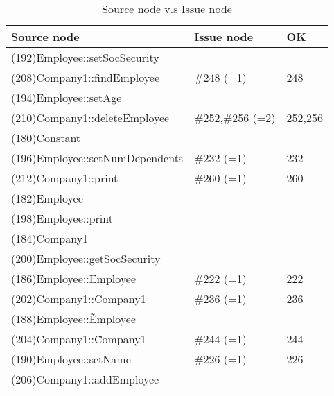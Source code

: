 \begin{table}[hb]
\begin{center}
\begin{tabular}{|l|l|l|}
\hline
Source node & Issue node  & OK\\
\hline
(192)Employee::setSocSecurity &  & \\
(208)Company1::findEmployee & \#248 (=1) & 248\\
(194)Employee::setAge &  & \\
(210)Company1::deleteEmployee & \#252,\#256 (=2) & 252,256 \\
(180)Constant &  & \\
(196)Employee::setNumDependents & \#232 (=1) & 232\\
(212)Company1::print & \#260 (=1) & 260\\
(182)Employee &  & \\
(198)Employee::print &  & \\
(184)Company1 &  & \\
(200)Employee::getSocSecurity &  & \\
(186)Employee::Employee & \#222 (=1) & 222\\
(202)Company1::Company1 & \#236 (=1) & 236\\
(188)Employee::\~Employee &  & \\
(204)Company1::\~Company1 & \#244 (=1) & 244\\
(190)Employee::setName & \#226 (=1) & 226\\
(206)Company1::addEmployee &  & \\
\hline
\end{tabular}
\caption{Source node v.s Issue node}
\end{center}
\end{table}

